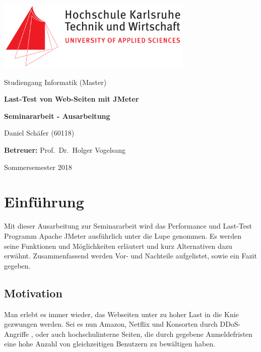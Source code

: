 \documentclass[a4paper,12pt]{article}
\author{Daniel Sch\"afer} \let\Author\@author
\begin{document}
\begin{titlepage}
	\centering
	\includegraphics[width=0.7\textwidth]{bilder/hskalogo}\par\vspace{1cm}
	\vspace{0.5cm}
	{\Large Studiengang Informatik (Master)}\par
	\vspace{2cm}
	{\huge\bfseries Last-Test von Web-Seiten mit JMeter}\par
	\vspace{2cm}
	{\Large\bfseries Seminararbeit - Ausarbeitung}\par
	\vspace{0.5cm}
	\vspace{3cm}
	
	{\Large Daniel Schäfer (60118)\par}
	\vspace{1cm}
	{\Large\textbf{Betreuer:} Prof.~Dr.~Holger Vogelsang} 
	\vfill
	{\Large Sommersemester 2018\par}
	\vfill
\end{titlepage}

\setcounter{page}{2}
\thispagestyle{empty} %
\tableofcontents
\pagebreak
\thispagestyle{empty}
\listoffigures
\pagebreak

\setcounter{page}{5}

\section{Einführung}
Mit dieser Ausarbeitung zur Seminararbeit wird das Performance und Last-Test Programm Apache JMeter ausführlich unter die Lupe genommen. Es werden seine Funktionen und Möglichkeiten erläutert und kurz Alternativen dazu erwähnt. Zusammenfassend werden Vor- und Nachteile aufgelistet, sowie ein Fazit gegeben.

\subsection{Motivation}
Man erlebt es immer wieder, das Webseiten unter zu hoher Last in die Knie gezwungen werden. Sei es nun Amazon, Netflix und Konsorten durch DDoS-Angriffe \cite{online:AmazonDDoS}, oder auch hochschulinterne Seiten, die durch gegebene Anmeldefristen eine hohe Anzahl von gleichzeitigen Benutzern zu bewältigen haben. 
\end{document}

